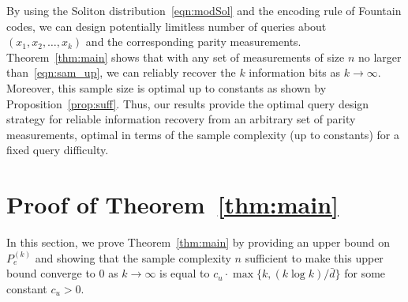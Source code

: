 \documentclass[11pt,onecolumn]{IEEEtran}
\newcommand{\bard}{\bar{d}}
\begin{document}
By using the Soliton distribution~\eqref{eqn:modSol} and the encoding rule of Fountain codes, we can design potentially limitless number of queries about $(x_1,x_2,\dots, x_k)$ and the corresponding parity measurements.  Theorem~\ref{thm:main} shows that with any set of measurements of size $n$ no larger than~\eqref{eqn:sam_up}, we can reliably recover the $k$ information bits as $k\to \infty$. 
Moreover, this sample size is optimal up to constants as shown by Proposition~\ref{prop:suff}.
Thus, our results provide the optimal query design strategy for reliable information recovery from an arbitrary set of parity measurements, optimal in terms of the sample complexity (up to constants) for a fixed query difficulty. 


\section{Proof of Theorem~\ref{thm:main}}\label{sec:proof}
In this section, we prove Theorem~\ref{thm:main} by providing an upper bound on $P_e^{(k)}$ and showing that the sample complexity $n$ sufficient to make this upper bound converge to $0$ as $k\to\infty$ is equal to $c_u\cdot \max\{k,(k\log k)/\bard\}$ for some constant $c_u>0$.
\end{document}
